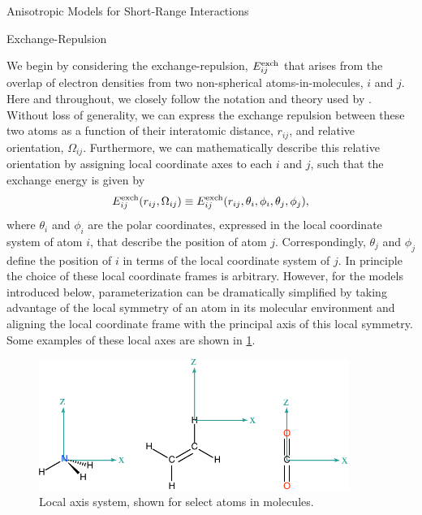 \begin{subsection}{Anisotropic Models for Short-Range Interactions}


\begin{subsubsection}{Exchange-Repulsion}
\label{sec:exchange_theory}

We begin by considering the exchange-repulsion, $E^{\text{exch}}_{ij}$ that arises from the overlap of
electron densities from two non-spherical atoms-in-molecules, $i$ and $j$. Here and
throughout, we closely follow the notation and theory used by
\citeauthor{stone2013theory}.\cite{stone2013theory}
Without loss of
generality, we can express the exchange repulsion between these two atoms as a
function of their interatomic distance, $r_{ij}$, and relative
orientation, $\Omega_{ij}$. Furthermore, we can mathematically describe this relative
orientation by assigning local coordinate axes to each $i$ and $j$, such that
the exchange energy is given by
%
\begin{align}
\label{eq:general_anisotropic_repulsion}
E^{\text{exch}}_{ij}(r_{ij},\Omega_{ij}) \equiv
E^{\text{exch}}_{ij}(r_{ij},\theta_i,\phi_i,\theta_j,\phi_j),
\end{align}
%
where $\theta_i$ and $\phi_i$ are the polar coordinates, expressed in the local
coordinate system of atom $i$, that describe the position of atom $j$.
Correspondingly, $\theta_j$ and $\phi_j$ define the position of $i$ in terms
of the local coordinate system of $j$. In principle the choice of these local coordinate
frames is arbitrary. However, for the models introduced below,
parameterization can be dramatically simplified by taking advantage of the
local symmetry of an atom in its molecular environment and aligning the local
coordinate frame with the principal axis of this local
symmetry.\cite{stone2013theory} Some examples of these local axes are shown in
\cref{fig:local_axis}.

          \begin{figure}
          \includegraphics[width=0.9\textwidth]{anisotropic/figures/local_coords-crop.pdf}  
          \caption{Local axis system, shown for select atoms in molecules.}
          \label{fig:local_axis}
          \end{figure}


\end{subsubsection}
\end{subsection}
